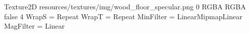 Texture2D
resources/textures/img/wood_floor_specular.png
0
RGBA
RGBA
false
4
WrapS = Repeat
WrapT = Repeat
MinFilter = LinearMipmapLinear
MagFilter = Linear
